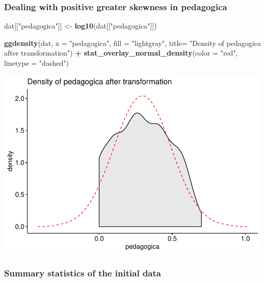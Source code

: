 \documentclass[]{article}
\newenvironment{Shaded}{\begin{snugshade}}{\end{snugshade}}
\newcommand{\DataTypeTok}[1]{\textcolor[rgb]{0.13,0.29,0.53}{#1}}
\newcommand{\KeywordTok}[1]{\textcolor[rgb]{0.13,0.29,0.53}{\textbf{#1}}}
\newcommand{\NormalTok}[1]{#1}
\newcommand{\OperatorTok}[1]{\textcolor[rgb]{0.81,0.36,0.00}{\textbf{#1}}}
\newcommand{\StringTok}[1]{\textcolor[rgb]{0.31,0.60,0.02}{#1}}
\begin{document}
\hypertarget{dealing-with-positive-greater-skewness-in-pedagogica}{%
\subsubsection{Dealing with positive greater skewness in
pedagogica}\label{dealing-with-positive-greater-skewness-in-pedagogica}}

\begin{Shaded}
\begin{Highlighting}[]
\NormalTok{dat[[}\StringTok{"pedagogica"}\NormalTok{]] <-}\StringTok{ }\KeywordTok{log10}\NormalTok{(dat[[}\StringTok{"pedagogica"}\NormalTok{]])}
\end{Highlighting}
\end{Shaded}

\begin{Shaded}
\begin{Highlighting}[]
\KeywordTok{ggdensity}\NormalTok{(dat, }\DataTypeTok{x =} \StringTok{"pedagogica"}\NormalTok{, }\DataTypeTok{fill =} \StringTok{"lightgray"}\NormalTok{, }\DataTypeTok{title=} \StringTok{"Density of pedagogica after transformation"}\NormalTok{) }\OperatorTok{+}
\StringTok{ }\KeywordTok{stat_overlay_normal_density}\NormalTok{(}\DataTypeTok{color =} \StringTok{"red"}\NormalTok{, }\DataTypeTok{linetype =} \StringTok{"dashed"}\NormalTok{)}
\end{Highlighting}
\end{Shaded}

\includegraphics{factorialAnova_files/figure-latex/unnamed-chunk-3-1.pdf}

\hypertarget{summary-statistics-of-the-initial-data}{%
\subsubsection{Summary statistics of the initial
data}\label{summary-statistics-of-the-initial-data}}
\end{document}
